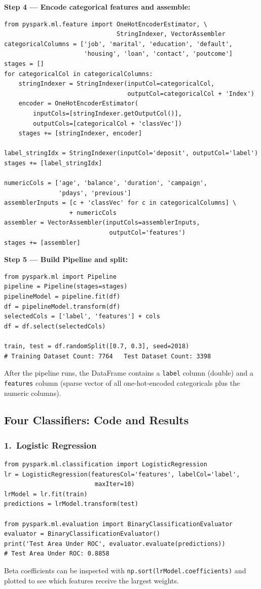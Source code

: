 \documentclass[11pt]{article}
\begin{document}
\textbf{Step 4 --- Encode categorical features and assemble:}
\begin{verbatim}
from pyspark.ml.feature import OneHotEncoderEstimator, \
                               StringIndexer, VectorAssembler
categoricalColumns = ['job', 'marital', 'education', 'default',
                      'housing', 'loan', 'contact', 'poutcome']
stages = []
for categoricalCol in categoricalColumns:
    stringIndexer = StringIndexer(inputCol=categoricalCol,
                                  outputCol=categoricalCol + 'Index')
    encoder = OneHotEncoderEstimator(
        inputCols=[stringIndexer.getOutputCol()],
        outputCols=[categoricalCol + 'classVec'])
    stages += [stringIndexer, encoder]

label_stringIdx = StringIndexer(inputCol='deposit', outputCol='label')
stages += [label_stringIdx]

numericCols = ['age', 'balance', 'duration', 'campaign',
               'pdays', 'previous']
assemblerInputs = [c + 'classVec' for c in categoricalColumns] \
                  + numericCols
assembler = VectorAssembler(inputCols=assemblerInputs,
                             outputCol='features')
stages += [assembler]
\end{verbatim}

\textbf{Step 5 --- Build Pipeline and split:}
\begin{verbatim}
from pyspark.ml import Pipeline
pipeline = Pipeline(stages=stages)
pipelineModel = pipeline.fit(df)
df = pipelineModel.transform(df)
selectedCols = ['label', 'features'] + cols
df = df.select(selectedCols)

train, test = df.randomSplit([0.7, 0.3], seed=2018)
# Training Dataset Count: 7764   Test Dataset Count: 3398
\end{verbatim}
After the pipeline runs, the DataFrame contains a \texttt{label} column (double) and a \texttt{features} column (sparse vector of all one-hot-encoded categoricals plus the numeric columns).

\subsection{Four Classifiers: Code and Results}

\subsubsection*{1.\ Logistic Regression}
\begin{verbatim}
from pyspark.ml.classification import LogisticRegression
lr = LogisticRegression(featuresCol='features', labelCol='label',
                         maxIter=10)
lrModel = lr.fit(train)
predictions = lrModel.transform(test)

from pyspark.ml.evaluation import BinaryClassificationEvaluator
evaluator = BinaryClassificationEvaluator()
print('Test Area Under ROC', evaluator.evaluate(predictions))
# Test Area Under ROC: 0.8858
\end{verbatim}
Beta coefficients can be inspected with \texttt{np.sort(lrModel.coefficients)} and plotted to see which features receive the largest weights.
\end{document}
